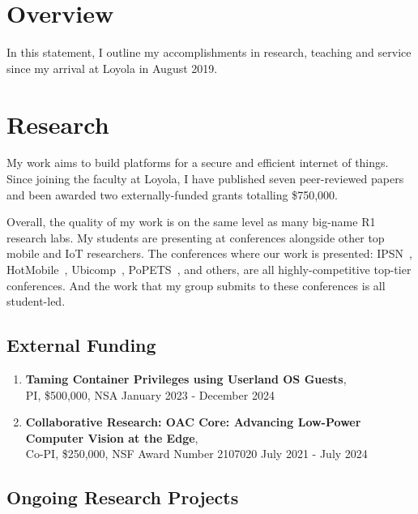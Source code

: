 \documentclass[10pt,onecolumn]{article}
\begin{document}
\section{Overview}

In this statement, I outline my accomplishments in research, teaching and service since my arrival at Loyola in August 2019.

\section{Research}

My work aims to build platforms for a secure and efficient internet of things.
Since joining the faculty at Loyola, I have published seven peer-reviewed papers and been awarded two externally-funded grants totalling \$750,000.

Overall, the quality of my work is on the same level as many big-name R1 research labs.
My students are presenting at conferences alongside other top mobile and IoT researchers.
The conferences where our work is presented: IPSN~\cite{moonshine}, HotMobile~\cite{v2vposter,ucbitgenposter}, Ubicomp~\cite{voltkey,aerokey}, PoPETS~\cite{mutebutton}, and others, are all highly-competitive top-tier conferences.
And the work that my group submits to these conferences is all student-led.



\subsection{External Funding}

\begin{enumerate}
\item 

    {\bf Taming Container Privileges using Userland OS Guests}, \\
    PI, \$500,000, NSA January 2023 - December 2024 

\item
    {\bf Collaborative Research: OAC Core: Advancing Low-Power Computer Vision at the Edge}, \\
    Co-PI, \$250,000, NSF Award Number 2107020 July 2021 - July 2024 
	
\end{enumerate}

\subsection{Ongoing Research Projects}
\end{document}
